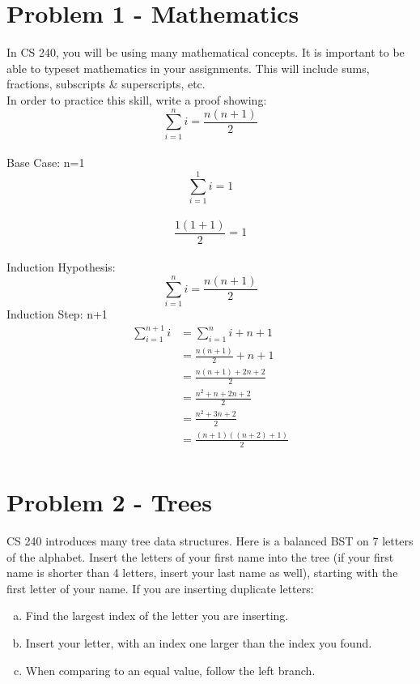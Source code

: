 \documentclass[12pt]{article}
\begin{document}

\section*{Problem 1 - Mathematics}
In CS 240, you will be using many mathematical concepts. It is important to be able to typeset mathematics in your assignments. This will include sums, fractions, subscripts \& superscripts, etc. \\
In order to practice this skill, write a proof showing: $$\sum_{i=1}^n i = \frac {n(n+1)} {2}$$\\
Base Case: n=1\\
$$\sum_{i=1}^1 i = 1$$\\
$$\frac {1(1+1)} {2} = 1$$\\
Induction Hypothesis:
$$\sum_{i=1}^n i = \frac {n(n+1)} {2}$$
Induction Step: n+1
\begin{align}
\sum_{i=1}^{n+1} i &= \sum_{i=1}^n i + n+1\\
&=\frac {n(n+1)} {2} + n + 1\\
&=\frac {n(n+1) + 2n + 2} {2}\\
&=\frac {n^2 + n + 2n + 2} {2}\\
&=\frac {n^2 + 3n + 2} {2}\\
&=\frac {(n+1)((n+2)+1)} {2}\\
\end{align}

\section*{Problem 2 - Trees}
CS 240 introduces many tree data structures. Here is a balanced BST on 7 letters of the
 alphabet. Insert the letters of your first name into the tree (if your first name is
shorter than 4 letters, insert your last name as well), starting
with the first letter of your name. If you are inserting duplicate
letters:


\begin{enumerate}[a)]
	\item Find the largest index of the letter you are inserting.
	\item Insert your letter, with an index one larger than the index you found.
	\item When comparing to an equal value, follow the left branch.

\end{enumerate}
\end{document}
